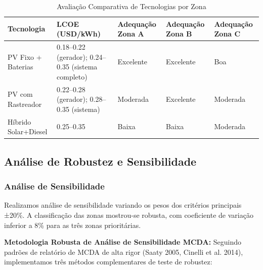 \documentclass[12pt, a4paper]{article}
\begin{document}
\begin{table}[H]
\centering
\caption{Avaliação Comparativa de Tecnologias por Zona}
\label{Tab:8}
\begin{tabular}{@{}l l l l l@{}}
\toprule
\textbf{Tecnologia} & \textbf{LCOE (USD/kWh)} & \textbf{Adequação Zona A} & \textbf{Adequação Zona B} & \textbf{Adequação Zona C} \\
\midrule
PV Fixo + Baterias & 0.18--0.22 (gerador); 0.24--0.35 (sistema completo) & Excelente & Excelente & Boa \\
PV com Rastreador & 0.22--0.28 (gerador); 0.28--0.35 (sistema) & Moderada & Excelente & Moderada \\
Híbrido Solar+Diesel & 0.25--0.35 & Baixa & Baixa & Moderada \\
\bottomrule
\end{tabular}
\end{table}

\subsection{Análise de Robustez e Sensibilidade}

\subsubsection{Análise de Sensibilidade}

Realizamos análise de sensibilidade variando os pesos dos critérios principais ±20\%. A classificação das zonas mostrou-se robusta, com coeficiente de variação inferior a 8\% para as três zonas prioritárias.

\textbf{Metodologia Robusta de Análise de Sensibilidade MCDA:} Seguindo padrões de relatório de MCDA de alta rigor (Saaty 2005, Cinelli et al. 2014), implementamos três métodos complementares de teste de robustez:
\end{document}
